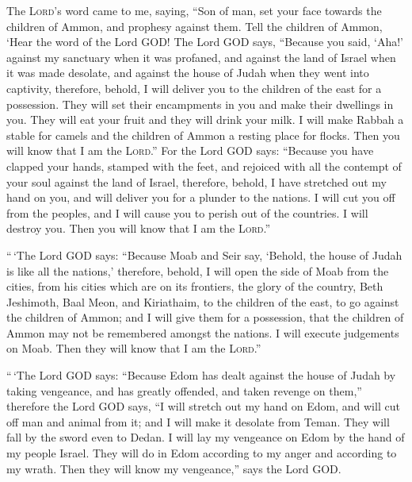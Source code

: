  The \textsc{Lord}'s word came to me, saying,
 ``Son of man, set your face towards the children of
Ammon, and prophesy against them.  Tell the children of
Ammon, `Hear the word of the Lord GOD! The Lord GOD says, ``Because you
said, `Aha!' against my sanctuary when it was profaned, and against the
land of Israel when it was made desolate, and against the house of Judah
when they went into captivity,  therefore, behold, I will
deliver you to the children of the east for a possession. They will set
their encampments in you and make their dwellings in you. They will eat
your fruit and they will drink your milk.  I will make
Rabbah a stable for camels and the children of Ammon a resting place for
flocks. Then you will know that I am the \textsc{Lord}.'' 
For the Lord GOD says: ``Because you have clapped your hands, stamped
with the feet, and rejoiced with all the contempt of your soul against
the land of Israel,  therefore, behold, I have stretched
out my hand on you, and will deliver you for a plunder to the nations. I
will cut you off from the peoples, and I will cause you to perish out of
the countries. I will destroy you. Then you will know that I am the
\textsc{Lord}.''

 ``\,`The Lord GOD says: ``Because Moab and Seir say,
`Behold, the house of Judah is like all the nations,' 
therefore, behold, I will open the side of Moab from the cities, from
his cities which are on its frontiers, the glory of the country, Beth
Jeshimoth, Baal Meon, and Kiriathaim,  to the children of
the east, to go against the children of Ammon; and I will give them for
a possession, that the children of Ammon may not be remembered amongst
the nations.  I will execute judgements on Moab. Then
they will know that I am the \textsc{Lord}.''

 ``\,`The Lord GOD says: ``Because Edom has dealt against
the house of Judah by taking vengeance, and has greatly offended, and
taken revenge on them,''  therefore the Lord GOD says,
``I will stretch out my hand on Edom, and will cut off man and animal
from it; and I will make it desolate from Teman. They will fall by the
sword even to Dedan.  I will lay my vengeance on Edom by
the hand of my people Israel. They will do in Edom according to my anger
and according to my wrath. Then they will know my vengeance,'' says the
Lord GOD.

